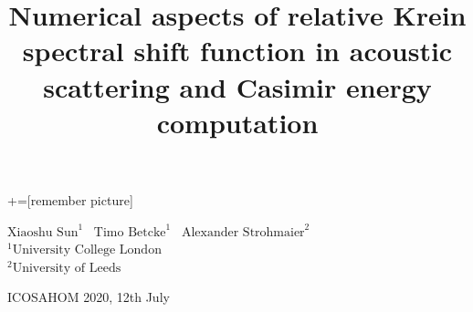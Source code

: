 \documentclass[dvipsnames,10pt]{beamer}
\title{Numerical aspects of relative Krein spectral shift function in acoustic scattering and Casimir energy computation}
\date{}
\begin{document}
\lstset{language=Python}
+=[remember picture]
\begin{frame}

\vspace{1cm}

\titlepage
\vspace{-2cm}

\begin{center}
    $\text{Xiaoshu Sun}^{1}$
    \ $\text{Timo Betcke}^{1}$ \ $\text{Alexander Strohmaier}^{2}$\\
\vspace{0.5cm}
    ${}^{1}\text{University College London}$\\
    ${}^{2}\text{University of Leeds}$
\end{center}
\vspace{0.5cm}
\begin{center}
    ICOSAHOM 2020, 12th July
\end{center}
\end{frame}
\end{document}
